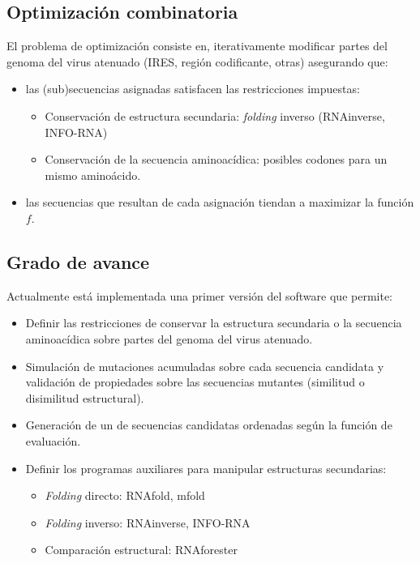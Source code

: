 \documentclass{beamer}
\begin{document}
\subsection{Optimizaci\'on combinatoria}
\begin{frame}
El problema de optimizaci\'on consiste en, iterativamente modificar partes
del genoma del virus atenuado (IRES, regi\'on codificante, otras) asegurando
que:
  \begin{itemize}
   \item las (sub)secuencias asignadas satisfacen las restricciones impuestas:
    \begin{itemize}
     \item Conservaci\'on de estructura secundaria: \textit{folding} inverso
(RNAinverse, INFO-RNA)
     \item Conservaci\'on de la secuencia aminoac\'idica: posibles codones para
un mismo amino\'acido.
    \end{itemize}
   \item las secuencias que resultan de cada asignaci\'on tiendan a maximizar la
funci\'on $f$.
  \end{itemize}
\end{frame}

\subsection{Grado de avance}
\begin{frame}
 Actualmente est\'a implementada una primer versi\'on del software que permite:
  \begin{itemize}
   \item Definir las restricciones de conservar la estructura secundaria o la
secuencia aminoac\'idica sobre partes del genoma del virus atenuado.
   \item Simulaci\'on de mutaciones acumuladas sobre cada secuencia candidata
y validaci\'on de propiedades sobre las secuencias mutantes (similitud o
disimilitud estructural).
   \item Generaci\'on de un  de secuencias candidatas ordenadas
seg\'un la funci\'on de evaluaci\'on.
   \item Definir los programas auxiliares para manipular estructuras
secundarias:
    \begin{itemize}
     \item \textit{Folding} directo: RNAfold, mfold
     \item \textit{Folding} inverso: RNAinverse, INFO-RNA
     \item Comparaci\'on estructural: RNAforester
    \end{itemize}
  \end{itemize}
\end{frame}
\end{document}
